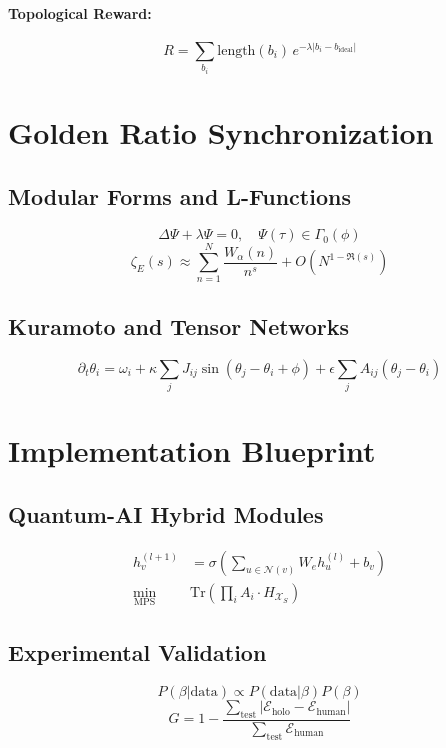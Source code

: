 \documentclass[11pt]{article}
\newcommand{\Xi}{\mathcal{X}}
\begin{document}
\paragraph{Topological Reward:}
\[
R = \sum_{b_i} \text{length}(b_i) \, e^{-\lambda |b_i - b_{\text{ideal}}|}
\]

\section{Golden Ratio Synchronization}

\subsection{Modular Forms and L-Functions}

\[
\Delta \Psi + \lambda \Psi = 0, \quad \Psi(\tau) \in \Gamma_0(\phi)
\]
\[
\zeta_E(s) \approx \sum_{n=1}^N \frac{W_\alpha(n)}{n^s} + O(N^{1 - \Re(s)})
\]

\subsection{Kuramoto and Tensor Networks}
\[
\partial_t \theta_i = \omega_i + \kappa \sum_j J_{ij} \sin(\theta_j - \theta_i + \phi) + \epsilon \sum_j A_{ij} (\theta_j - \theta_i)
\]

\section{Implementation Blueprint}

\subsection{Quantum-AI Hybrid Modules}

\begin{align*}
h_v^{(l+1)} &= \sigma \left( \sum_{u \in \mathcal{N}(v)} W_e h_u^{(l)} + b_v \right) \\
\min_{\text{MPS}} \quad & \text{Tr} \left( \prod_i A_i \cdot H_{\Xi_S} \right)
\end{align*}

\subsection{Experimental Validation}
\[
P(\beta | \text{data}) \propto P(\text{data} | \beta) P(\beta)
\]
\[
G = 1 - \frac{\sum_{\text{test}} |\mathcal{E}_{\text{holo}} - \mathcal{E}_{\text{human}}|}{\sum_{\text{test}} \mathcal{E}_{\text{human}}}
\]
\end{document}
